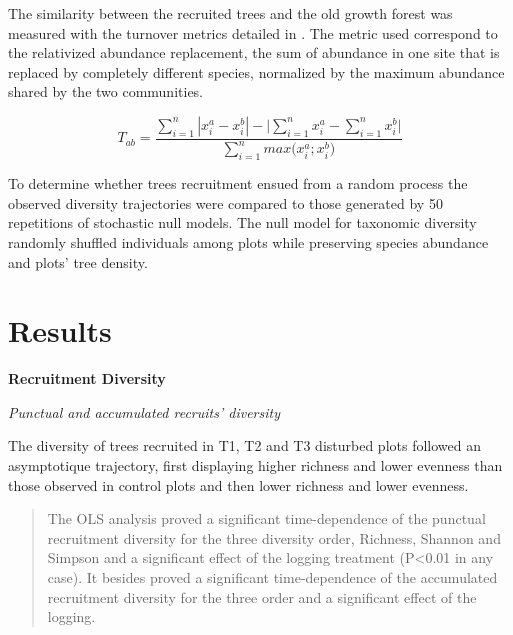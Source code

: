 \documentclass[fleqn,10pt]{ArtEcoFoG} %
\begin{document}
The similarity between the recruited trees and the old growth forest was
measured with the turnover metrics detailed in \citet{Podani2013a}. The
metric used correspond to the relativized abundance replacement, the sum
of abundance in one site that is replaced by completely different
species, normalized by the maximum abundance shared by the two
communities.

\[ T_{ab}=\frac{\displaystyle\sum_{i=1}^{n}|x_i^a - x_i^b| - \bigg|\sum_{i=1}^{n} x_i^a - \sum_{i=1}^{n} x_i^b \bigg|}{\displaystyle\sum_{i=1}^{n}max\big({x_i^a;x_i^b\big) }} \]

To determine whether trees recruitment ensued from a random process the
observed diversity trajectories were compared to those generated by 50
repetitions of stochastic null models. The null model for taxonomic
diversity randomly shuffled individuals among plots while preserving
species abundance and plots' tree density.

\section{Results}\label{results}

\textbf{Recruitment Diversity}

\emph{Punctual and accumulated recruits' diversity}

The diversity of trees recruited in T1, T2 and T3 disturbed plots
followed an asymptotique trajectory, first displaying higher richness
and lower evenness than those observed in control plots and then lower
richness and lower evenness.

\begin{quote}
The OLS analysis proved a significant time-dependence of the punctual
recruitment diversity for the three diversity order, Richness, Shannon
and Simpson and a significant effect of the logging treatment
(P\textless{}0.01 in any case). It besides proved a significant
time-dependence of the accumulated recruitment diversity for the three
order and a significant effect of the logging.
\end{quote}
\end{document}
